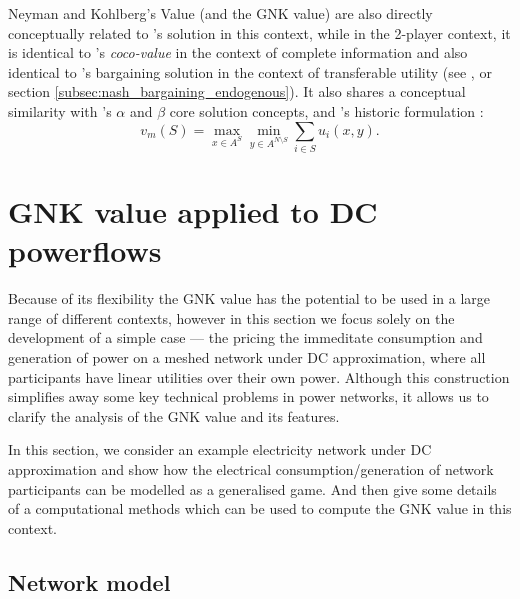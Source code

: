 Neyman and Kohlberg's Value (and the GNK value) are also directly conceptually related to \cite{values3}'s solution in this context,
while in the 2-player context, it is identical to \cite{kalai1,Kalai2010}'s \textit{coco-value} in the context of complete information  
and also identical to \cite{nash2}'s bargaining solution in the context of transferable utility (see \cite{value2}, or section \ref{subsec:nash_bargaining_endogenous}).
It also shares a conceptual similarity with \cite{aumann1961core}'s $\alpha$ and $\beta$ core solution concepts, and \cite{1944}'s historic formulation :
\begin{equation}\label{knvalue3}v_m(S) = \max_{x\in A^S}\min_{y\in A^{N\setminus S}} \sum_{i\in S} u_i(x,y).\end{equation}


\section{GNK value applied to DC powerflows}\label{more_involved}

Because of its flexibility the GNK value has the potential to be used in a large range of different contexts,
however in this section we focus solely on the development of a simple case --- the pricing the immeditate consumption and generation of power on a meshed network under DC approximation, where all participants have linear utilities over their own power.
Although this construction simplifies away some key technical problems in power networks, it allows us to clarify the analysis of the GNK value and its features.

In this section, we consider an example electricity network under DC approximation and show how the electrical consumption/generation of network participants can be modelled as a generalised game. And then give some details of a computational methods which can be used to compute the GNK value in this context.

\subsection{Network model}\label{sec:the_setup}


